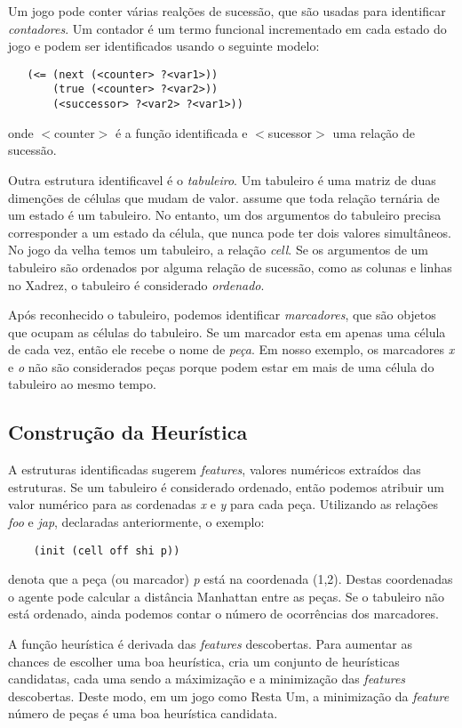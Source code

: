 Um jogo pode conter várias realções de sucessão, que são usadas para identificar
{\it contadores}. Um contador é um termo funcional incrementado em cada estado
do jogo e podem ser identificados usando o seguinte modelo:
\begin{verbatim}
   (<= (next (<counter> ?<var1>))
       (true (<counter> ?<var2>))
       (<successor> ?<var2> ?<var1>))
\end{verbatim}
onde $<$counter$>$ é a função identificada e $<$sucessor$>$ uma relação de sucessão.
 
Outra estrutura identificavel é o {\it tabuleiro}. Um tabuleiro é uma matriz de
duas dimenções de células que mudam de valor. \cite{dresner} assume que toda
relação ternária de um estado é um tabuleiro. No entanto, um dos argumentos do
tabuleiro precisa corresponder a um estado da célula, que nunca pode ter dois
valores simultâneos. No jogo da velha temos um tabuleiro, a relação {\it cell}.
Se os argumentos de um tabuleiro são ordenados por alguma relação de sucessão, como as colunas e linhas no Xadrez, o tabuleiro é considerado {\it ordenado}.
 
Após reconhecido o tabuleiro, podemos identificar {\it marcadores}, que são
objetos que ocupam as células do tabuleiro. Se um marcador esta em apenas uma
célula de cada vez, então ele recebe o nome de {\it peça}. Em nosso exemplo, os
marcadores {\it x} e {\it o} não são considerados peças porque podem estar em
mais de uma célula do tabuleiro ao mesmo tempo.

\subsection{Construção da Heurística}
A estruturas identificadas sugerem {\it features}, valores numéricos extraídos das estruturas. Se um tabuleiro é considerado ordenado, então podemos atribuir um valor numérico para as cordenadas {\it x} e {\it y} para cada peça. Utilizando as relações {\it foo} e {\it jap}, declaradas anteriormente, o exemplo:
\begin{verbatim}
    (init (cell off shi p))    
\end{verbatim}
denota que a peça (ou marcador) {\it p} está na coordenada (1,2). Destas coordenadas o agente pode calcular a distância Manhattan entre as peças. Se o tabuleiro não está ordenado, ainda podemos contar o número de ocorrências dos marcadores.

A função heurística é derivada das {\it features} descobertas. Para aumentar as chances de escolher uma boa heurística, \cite{dresner} cria um conjunto de heurísticas candidatas, cada uma sendo a máximização e a minimização das {\it features} descobertas. Deste modo, em um jogo como Resta Um, a minimização da {\it feature} número de peças é uma boa heurística candidata.

